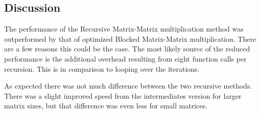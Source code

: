 \documentclass{article}
\begin{document}
\subsection{Discussion}
The performance of the Recursive Matrix-Matrix multiplication method was outperformed by that of optimized Blocked Matrix-Matrix multiplication. There are a few reasons this could be the case. The most likely source of the reduced performance is the additional overhead resulting from eight function calls per recursion. This is in comparison to looping over the iterations.

\noindent As expected there was not much difference between the two recursive methods. There was a slight improved speed from the intermediates version for larger matrix sizes, but that difference was even less for small matrices.
\end{document}

